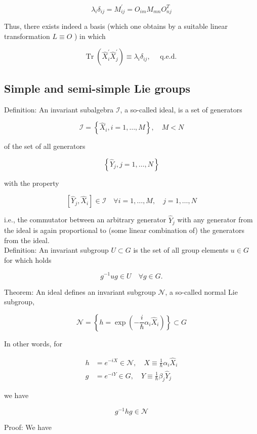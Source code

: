 \documentclass[10pt, letterpaper]{article}
\begin{document}
$$
\lambda_{i} \delta_{i j}=M_{i j}^{\prime}=O_{i m} M_{m n} O_{n j}^{T}
$$

Thus, there exists indeed a basis (which one obtains by a suitable linear transformation $L \equiv O$ ) in which

$$
\operatorname{Tr}\left(\hat{X}_{i}^{\prime} \hat{X}_{j}^{\prime}\right) \equiv \lambda_{i} \delta_{i j}, \quad \text { q.e.d. }
$$

\subsection{Simple and semi-simple Lie groups}
Definition: An invariant subalgebra $\mathcal{I}$, a so-called ideal, is a set of generators

$$
\mathcal{I}=\left\{\hat{X}_{i}, i=1, \ldots, M\right\}, \quad M<N
$$

of the set of all generators

$$
\left\{\hat{Y}_{j}, j=1, \ldots, N\right\}
$$

with the property

$$
\left[\hat{Y}_{j}, \hat{X}_{i}\right] \in \mathcal{I} \quad \forall i=1, \ldots, M, \quad j=1, \ldots, N
$$

i.e., the commutator between an arbitrary generator $\hat{Y}_{j}$ with any generator from the ideal is again proportional to (some linear combination of) the generators from the ideal.\\
Definition: An invariant subgroup $U \subset G$ is the set of all group elements $u \in G$ for which holds

$$
g^{-1} u g \in U \quad \forall g \in G .
$$

Theorem: An ideal defines an invariant subgroup $\mathcal{N}$, a so-called normal Lie subgroup,

$$
\mathcal{N}=\left\{h=\exp \left(-\frac{i}{\hbar} \alpha_{i} \hat{X}_{i}\right)\right\} \subset G
$$

In other words, for

$$
\begin{aligned}
h & =e^{-i X} \in \mathcal{N}, \quad X \equiv \frac{1}{\hbar} \alpha_{i} \hat{X}_{i} \\
g & =e^{-i Y} \in G, \quad Y \equiv \frac{1}{\hbar} \beta_{j} \hat{Y}_{j}
\end{aligned}
$$

we have

$$
g^{-1} h g \in \mathcal{N}
$$

Proof: We have
\end{document}
